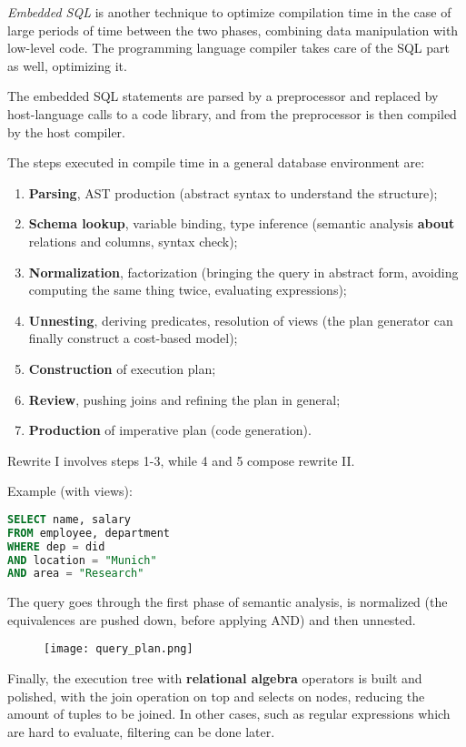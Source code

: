 \textit{Embedded SQL} is another technique to optimize compilation time in the case of large periods of time between the two phases, combining data manipulation with low-level code. The programming language compiler takes care of the SQL part as well, optimizing it.

The embedded SQL statements are parsed by a preprocessor and replaced by host-language calls to a code library, and from the preprocessor is then compiled by the host compiler.

The steps executed in compile time in a general database environment are:
\begin{enumerate}
	\item \textbf{Parsing}, AST production (abstract syntax to understand the structure);
	\item \textbf{Schema lookup}, variable binding, type inference (semantic analysis \textbf{about} relations and columns, syntax check);
	\item \textbf{Normalization}, factorization (bringing the query in abstract form, avoiding computing the same thing twice, evaluating expressions);
	\item \textbf{Unnesting}, deriving predicates, resolution of views (the plan generator can finally construct a cost-based model);
	\item \textbf{Construction} of execution plan;
	\item \textbf{Review}, pushing joins and refining the plan in general;
	\item \textbf{Production} of imperative plan (code generation).
\end{enumerate}
Rewrite I involves steps 1-3, while 4 and 5 compose rewrite II.

Example (with views):
\begin{lstlisting}[language=SQL]
SELECT name, salary
FROM employee, department
WHERE dep = did
AND location = "Munich"
AND area = "Research"
\end{lstlisting}
The query goes through the first phase of semantic analysis, is normalized (the equivalences are pushed down, before applying AND) and then unnested. 

\begin{figure}[h]
	\texttt{[image: query\_plan.png]}
	\centering
\end{figure}
Finally, the execution tree with \textbf{relational algebra} operators is built and polished, with the join operation on top and selects on nodes, reducing the amount of tuples to be joined. In other cases, such as regular expressions which are hard to evaluate, filtering can be done later.

